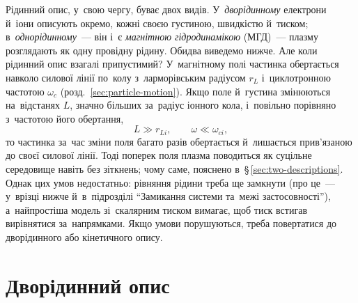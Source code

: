 Рідинний опис, у~свою чергу, буває двох видів. У~\emph{дворідинному} електрони й~іони описують окремо, кожні
своєю густиною, швидкістю й~тиском; в~\emph{однорідинному}~--- він і~є \emph{магнітною гідродинамікою} (МГД)~--- плазму
розглядають як одну провідну рідину. Обидва виведемо нижче. Але коли рідинний опис взагалі припустимий?
У~магнітному полі частинка обертається навколо силової лінії по~колу з~ларморівським радіусом $r_L$ і~циклотронною
частотою $\omega_c$ (розд.~\ref{sec:particle-motion}). Якщо поле й~густина змінюються на~відстанях $L$,
значно більших за~радіус іонного кола, і~повільно порівняно з~частотою його обертання,
\begin{equation*}
L\gg r_{Li},\qquad \omega\ll\omega_{ci},
\end{equation*}
то частинка за~час зміни поля багато разів обертається й~лишається прив'язаною до своєї силової лінії.
Тоді поперек поля плазма поводиться як суцільне середовище навіть без зіткнень; чому саме, пояснено в~§\,\ref{sec:two-descriptions}.
Однак цих умов недостатньо: рівняння рідини треба ще замкнути (про це~--- у~врізці нижче й~в~підрозділі \enquote{Замикання системи та~межі застосовності}),
а~найпростіша модель зі~скалярним тиском вимагає, щоб тиск встигав вирівнятися за~напрямками. Якщо умови
порушуються, треба повертатися до дворідинного або кінетичного опису.


\section{Дворідинний опис}


